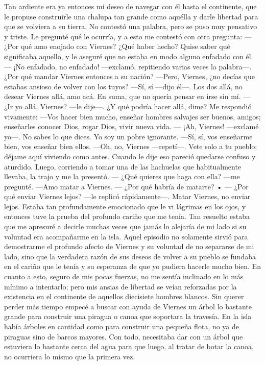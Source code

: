 \documentclass{novela}
\begin{document}
    Tan ardiente era ya entonces mi deseo de navegar con él hasta el continente, que le propuse construirle una chalupa tan grande como aquélla y darle libertad para que se volviera a su tierra. No contestó una palabra, pero se puso muy pensativo y triste. Le pregunté qué le ocurría, y a esto me contestó con otra pregunta:
    — ¿Por qué amo enojado con Viernes? ¿Qué haber hecho?
    Quise saber qué significaba aquello, y le aseguré que no estaba en modo alguno enfadado con él.
    — ¡No enfadado, no enfadado! —exclamó, repitiendo varias veces la palabra—. ¿Por qué mandar Viernes entonces a su nación?
    —Pero, Viernes, ¿no decías que estabas ansioso de volver con los tuyos?
    —Sí, sí —dijo él—. Los dos allá, no desear Viernes allá, amo acá.
    En suma, que no quería pensar en irse sin mí.
    — ¿Ir yo allá, Viernes? —le dije—. ¿Y qué podría hacer allá, dime?
    Me respondió vivamente:
    —Vos hacer bien mucho, enseñar hombres salvajes ser buenos, amigos; enseñarles conocer Dios, rogar Dios, vivir nueva vida.
    — ¡Ah, Viernes! —exclamé yo—. No sabes lo que dices. Yo soy un pobre ignorante.
    —Sí, sí, vos enseñarme bien, vos enseñar bien ellos.
    —Oh, no, Viernes —repetí—. Vete solo a tu pueblo; déjame aquí viviendo como antes.
    Cuando le dije eso pareció quedarse confuso y aturdido. Luego, corriendo a tomar una de las hachuelas que habitualmente llevaba, la trajo y me la presentó.
    — ¿Qué quieres que haga con ella? —me pregunté.
    —Amo matar a Viernes.
    — ¿Por qué habría de matarte? •
    — ¿Por qué enviar Viernes lejos? —le replicó rápidamente—. Matar Viernes, no enviar lejos.
    Estaba tan profundamente emocionado que le vi lágrimas en los ojos, y entonces tuve la prueba del profundo cariño que me tenía. Tan resuelto estaba que me apresuré a decirle muchas veces que jamás lo alejaría de mi lado si su voluntad era acompañarme en la isla.
    Aquel episodio no solamente sirvió para demostrarme el profundo afecto de Viernes y su voluntad de no separarse de mi lado, sino que la verdadera razón de sus deseos de volver a su pueblo se fundaba en el cariño que le tenía y su esperanza de que yo pudiera hacerle mucho bien. En cuanto a esto, seguro de mis pocas fuerzas, no me sentía inclinado en lo más mínimo a intentarlo; pero mis ansias de libertad se veían reforzadas por la existencia en el continente de aquellos diecisiete hombres blancos. Sin querer perder más tiempo empecé a buscar con ayuda de Viernes un árbol lo bastante grande para construir una piragua o canoa que soportara la travesía. En la isla había árboles en cantidad como para construir una pequeña flota, no ya de piraguas sino de barcos mayores. Con todo, necesitaba dar con un árbol que estuviera lo bastante cerca del agua para que luego, al tratar de botar la canoa, no ocurriera lo mismo que la primera vez.
\end{document}

